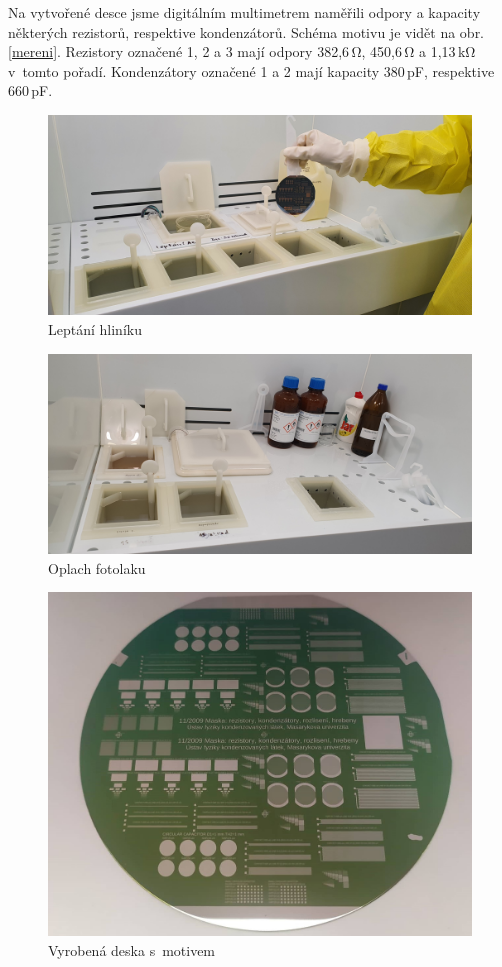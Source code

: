 \documentclass[a4paper,12pt]{article}
\begin{document}
Na vytvořené desce jsme digitálním multimetrem naměřili odpory a kapacity 
některých rezistorů, respektive kondenzátorů. Schéma motivu je vidět na obr. 
\ref{mereni}. Rezistory označené 1, 2 a 3 mají odpory 382,6\,\si{\ohm}, 
450,6\,\si{\ohm} a 1,13\,\si{\kilo\ohm} v~tomto pořadí. Kondenzátory označené 1 
a 2 mají kapacity 380\,\si{\pico\farad}, respektive 660\,\si{\pico\farad}.


\begin{figure}[h!]
	\centering
	\includegraphics[width=130mm]{8Aletch.jpg}
	\caption{Leptání hliníku}
	\label{8Aletch}
\end{figure}

\begin{figure}[h!]
	\centering
	\includegraphics[width=130mm]{11oplach.jpg}
	\caption{Oplach fotolaku}
	\label{11oplach}
\end{figure}

\newpage
\begin{figure}[h!]
	\centering
	\includegraphics[width=130mm]{deska.jpg}
	\caption{Vyrobená deska s~motivem}
	\label{deska}
\end{figure}
\end{document}
